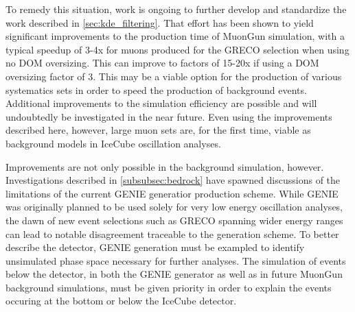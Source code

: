 To remedy this situation, work is ongoing to further develop and standardize the work described in \ref{sec:kde_filtering}. 
That effort has been shown to yield significant improvements to the production time of MuonGun simulation, with a typical speedup of 3-4x for muons produced for the GRECO selection when using no DOM oversizing.
This can improve to factors of 15-20x if using a DOM oversizing factor of 3.
This may be a viable option for the production of various systematics sets in order to speed the production of background events.
Additional improvements to the simulation efficiency are possible and will undoubtedly be investigated in the near future.
Even using the improvements described here, however, large muon sets are, for the first time, viable as background models in IceCube oscillation analyses.

Improvements are not only possible in the background simulation, however.
Investigations described in \ref{subsubsec:bedrock} have spawned discussions of the limitations of the current GENIE generatior production scheme.
While GENIE was originally planned to be used solely for very low energy oscillation analyses, the dawn of new event selections such as GRECO spanning wider energy ranges can lead to notable disagreement traceable to the generation scheme.
To better describe the detector, GENIE generation must be exampled to identify unsimulated phase space necessary for further analyses.
The simulation of events below the detector, in both the GENIE generator as well as in future MuonGun background simulations, must be given priority in order to explain the events occuring at the bottom or below the IceCube detector.

